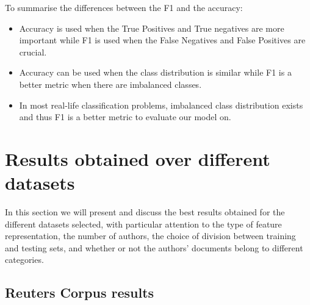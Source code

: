 To summarise the differences between the F1 and the accuracy:
\begin{itemize}
	\item Accuracy is used when the True Positives and True negatives are more important while F1 is used when the False Negatives and False Positives are crucial.
	\item Accuracy can be used when the class distribution is similar while F1 is a better metric when there are imbalanced classes.
	\item In most real-life classification problems, imbalanced class distribution exists and thus F1 is a better metric to evaluate our model on.
\end{itemize}

\section{Results obtained over different datasets}

In this section we will present and discuss the best results obtained for the different datasets selected, with particular attention to the type of feature representation, the number of authors, the choice of division between training and testing sets, and whether or not the authors' documents belong to different categories.

\subsection{Reuters Corpus results}

